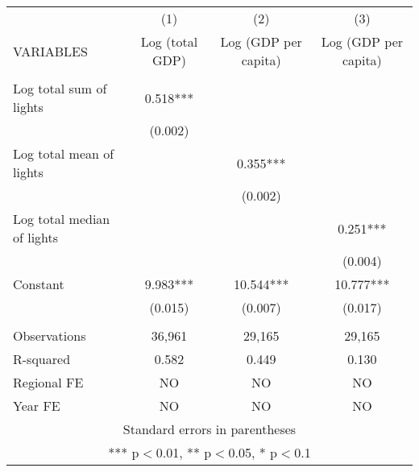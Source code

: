 \documentclass[]{article}
\begin{document}
\begin{tabular}{lccc} \hline
 & (1) & (2) & (3) \\
VARIABLES & Log (total GDP) & Log (GDP per capita) & Log (GDP per capita) \\ \hline
 &  &  &  \\
Log total sum of lights & 0.518*** &  &  \\
 & (0.002) &  &  \\
Log total mean of lights &  & 0.355*** &  \\
 &  & (0.002) &  \\
Log total median of lights &  &  & 0.251*** \\
 &  &  & (0.004) \\
Constant & 9.983*** & 10.544*** & 10.777*** \\
 & (0.015) & (0.007) & (0.017) \\
 &  &  &  \\
Observations & 36,961 & 29,165 & 29,165 \\
R-squared & 0.582 & 0.449 & 0.130 \\
Regional FE & NO & NO & NO \\
 Year FE & NO & NO & NO \\ \hline
\multicolumn{4}{c}{ Standard errors in parentheses} \\
\multicolumn{4}{c}{ *** p$<$0.01, ** p$<$0.05, * p$<$0.1} \\
\end{tabular}
\end{document}
